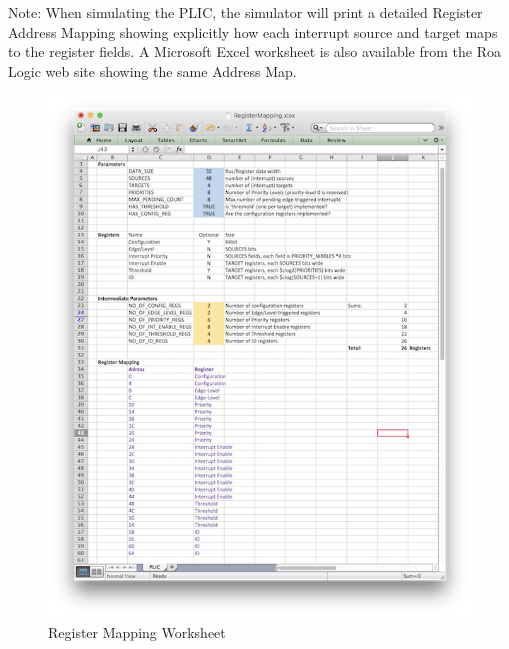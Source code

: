 Note: When simulating the PLIC, the simulator will print a detailed Register Address
Mapping showing explicitly how each interrupt source and target maps to the register fields. A Microsoft Excel worksheet is also available from the Roa Logic web site showing the same Address Map.

\begin{figure}[ht]
\includegraphics{../assets/graphics/AHB-Lite_PLIC_Worksheet.png}
\caption{Register Mapping Worksheet}
\label{fig:WORKSHEET}
\end{figure}
